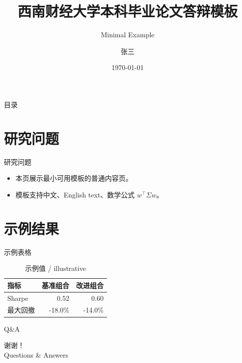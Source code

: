 \documentclass[aspectratio=169,11pt]{beamer}
\title{西南财经大学本科毕业论文答辩模板}
\subtitle{Minimal Example}
\author{张三}
\date{\today}
\begin{document}
\begin{frame}
  \titlepage
\end{frame}

\begin{frame}{目录}
  \tableofcontents
\end{frame}

\section{研究问题}

\begin{frame}{研究问题}
  \begin{itemize}
    \item 本页展示最小可用模板的普通内容页。
    \item 模板支持中文、English text、数学公式 $w^\top \Sigma w$。
  \end{itemize}
\end{frame}

\section{示例结果}

\begin{frame}{示例表格}
  \begin{table}
    \centering
    \caption{示例值 / illustrative}
    \begin{tabular}{lrr}
      \toprule
      指标 & 基准组合 & 改进组合 \\
      \midrule
      Sharpe & 0.52 & 0.60 \\
      最大回撤 & -18.0\% & -14.0\% \\
      \bottomrule
    \end{tabular}
  \end{table}
\end{frame}

\begin{frame}{Q\&A}
  \begin{center}
    {\Large 谢谢！}\\[0.4cm]
    Questions \& Answers
  \end{center}
\end{frame}
\end{document}
